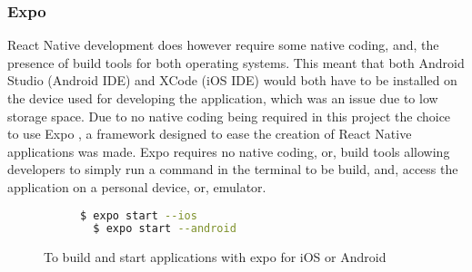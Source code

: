 \subsubsection{Expo}
React Native development does however require some native coding, and, the presence of build tools for both operating systems. This meant that both Android Studio (Android IDE) and XCode (iOS IDE) would both have to be installed on the device used for developing the application, which was an issue due to low storage space. Due to no native coding being required in this project the choice to use Expo \cite{expo}, a framework designed to ease the creation of React Native applications was made. Expo requires no native coding, or, build tools allowing developers to simply run a command in the terminal to be build, and, access the application on a personal device, or, emulator.
\begin{figure}[!htbp]
\centering
\begin{subfigure}[b]{0.5\textwidth}
\begin{lstlisting}[language=bash]
  $ expo start --ios
  $ expo start --android
\end{lstlisting}
\end{subfigure}
\caption{To build and start applications with expo for iOS or Android}
\end{figure}
